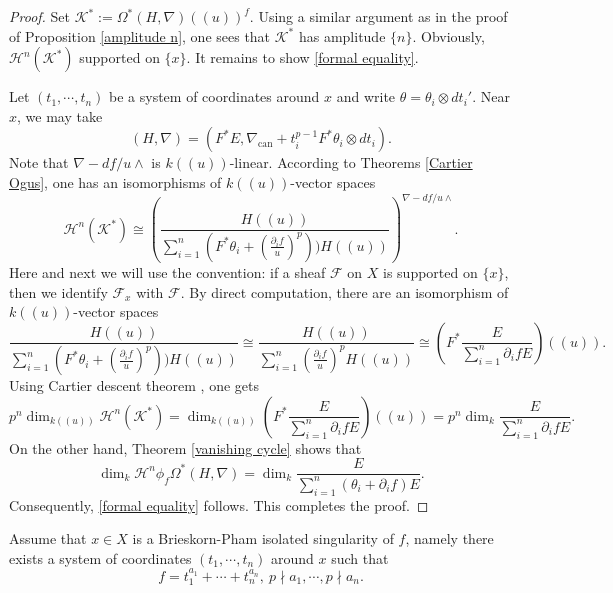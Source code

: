 \documentclass[12pt, a4paper]{article}
\begin{document}
\begin{proof}
Set $\mathcal K^*:=\Omega^*(H,\nabla)((u))^f$. Using a similar argument as in the proof of Proposition \ref{amplitude n}, one sees that $\mathcal K^*$ has amplitude $\{n\}$. Obviously, $\mathcal H^n(\mathcal K^*)$ supported on $\{x\}$. It remains to show \eqref{formal equality}.

Let $(t_1,\cdots,t_n)$ be a system of coordinates around $x$ and write $\theta=\theta_i\otimes dt_i'$. Near $x$, we may take
$$
(H,\nabla)=(F^*E,\nabla_\mathrm{can}+t_i^{p-1}F^*\theta_i\otimes dt_i).
$$
Note that $\nabla-df/u\wedge$ is $k((u))$-linear.  According to Theorems \ref{Cartier Ogus}, one has an isomorphisms of $k((u))$-vector spaces
$$ 
\mathcal H^n(\mathcal K^*)\cong(\frac{H((u))}{\sum_{i=1}^n(F^*\theta_i+(\frac{\partial_i f}{u})^p))H((u))})^{\nabla-df/u\wedge}.
$$
Here and next we will use the convention: if a sheaf $\mathcal F$ on $X$ is supported on $\{x\}$, then we identify $\mathcal F_x$ with $\mathcal F$.
By direct computation, there are an isomorphism of $k((u))$-vector spaces
$$
\frac{H((u))}{\sum_{i=1}^n(F^*\theta_i+(\frac{\partial_i f}{u})^p))H((u))}\cong\frac{H((u))}{\sum_{i=1}^n(\frac{\partial_i f}{u})^pH((u))}\cong(F^*\frac{E}{\sum_{i=1}^n\partial_i fE})((u)).
$$
Using Cartier descent theorem \cite[Theorem 5.1]{Katz}, one gets
$$
p^n\dim_{k((u))}\mathcal H^n(\mathcal K^*)=\dim_{k((u))}(F^*\frac{E}{\sum_{i=1}^n\partial_i fE})((u))=p^n\dim_k\frac{E}{\sum_{i=1}^n\partial_i fE}.$$
On the other hand, Theorem \ref{vanishing cycle} shows that
$$
\dim_k\mathcal H^n\phi_f\Omega^*(H,\nabla)=\dim_k\frac{E}{\sum_{i=1}^n(\theta_i+\partial_i f)E}.
$$
Consequently, \eqref{formal equality} follows. This completes the proof.
\end{proof}
 Assume that $x\in X$ is a Brieskorn-Pham isolated singularity of $f$, namely there exists a system of coordinates $(t_1,\cdots,t_n)$ around $x$ such that
$$
f=t_1^{a_1}+\cdots+t_n^{a_n},~p\nmid a_1,\cdots,p\nmid a_n.
$$
\end{document}
